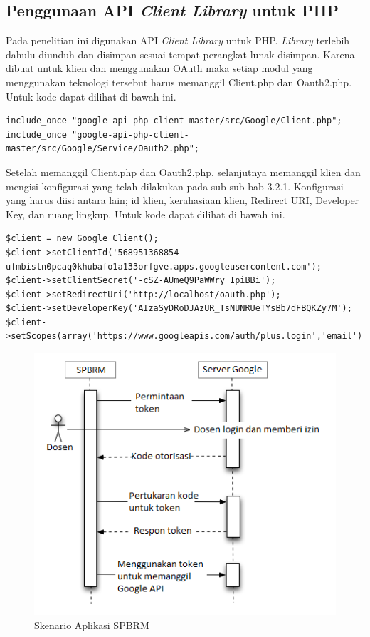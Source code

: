 \subsection{Penggunaan API {\it Client Library} untuk PHP}
Pada penelitian ini digunakan API {\it Client Library} untuk PHP. {\it Library} terlebih dahulu diunduh dan disimpan sesuai tempat perangkat lunak disimpan. Karena dibuat untuk klien dan menggunakan OAuth maka setiap modul yang menggunakan teknologi tersebut harus memanggil Client.php dan Oauth2.php. Untuk kode dapat dilihat di bawah ini.
\begin{lstlisting}[basicstyle=\footnotesize]
include_once "google-api-php-client-master/src/Google/Client.php";
include_once "google-api-php-client-master/src/Google/Service/Oauth2.php";
\end{lstlisting}

Setelah memanggil Client.php dan Oauth2.php, selanjutnya memanggil klien dan mengisi konfigurasi yang telah dilakukan pada sub sub bab 3.2.1. Konfigurasi yang harus diisi antara lain; id klien, kerahasiaan klien, Redirect URI, Developer Key, dan ruang lingkup. Untuk kode dapat dilihat di bawah ini.
\begin{lstlisting}[basicstyle=\footnotesize]
$client = new Google_Client();
$client->setClientId('568951368854-ufmbistn0pcaq0khubafo1a133orfgve.apps.googleusercontent.com');
$client->setClientSecret('-cSZ-AUmeQ9PaWWry_IpiBBi');
$client->setRedirectUri('http://localhost/oauth.php'); 
$client->setDeveloperKey('AIzaSyDRoDJAzUR_TsNUNRUeTYsBb7dFBQKZy7M');
$client->setScopes(array('https://www.googleapis.com/auth/plus.login','email'));
\end{lstlisting}

\begin{figure}[ht]
\centering
\includegraphics[scale=1]{Gambar/skenarioaplikasispbrm.png}
\caption[Skenario Aplikasi SPBRM]{Skenario Aplikasi SPBRM} 
\label{fig:skenarioaplikasiSPBRM}
\end{figure}


